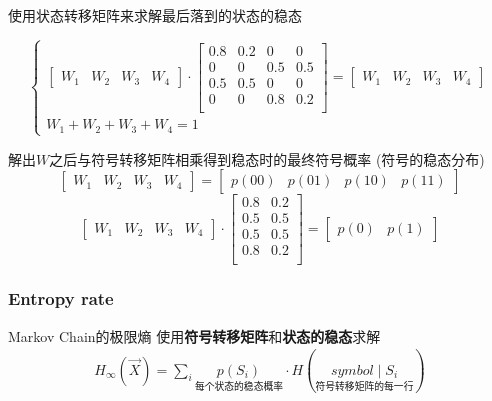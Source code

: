 \documentclass[a4paper]{report}
\begin{document}
使用状态转移矩阵来求解最后落到的状态的稳态

\[
  \begin{cases}
    \begin{bmatrix}
      W_1&W_2&W_3&W_4
    \end{bmatrix}
    \cdot 
      \begin{bmatrix}
   0.8 & 0.2&0&0  \\
  0&0& 0.5 & 0.5  \\
   0.5 & 0.5&0&0  \\
  0&0& 0.8 & 0.2  \\
  \end{bmatrix}
    =
        \begin{bmatrix}
      W_1&W_2&W_3&W_4
    \end{bmatrix}
    \\
    W_1+W_2+W_3+W_4=1
  \end{cases}
  \]

  解出$W$之后与符号转移矩阵相乘得到稳态时的最终符号概率 (符号的稳态分布)
  \[
        \begin{bmatrix}
      W_1&W_2&W_3&W_4
    \end{bmatrix}
    =
    \begin{bmatrix}
      p(00)&p(01)&p(10)&p(11)
    \end{bmatrix}
    \]
\[
    \begin{bmatrix}
      W_1&W_2&W_3&W_4
    \end{bmatrix}
    \cdot 
      \begin{bmatrix}
   0.8 & 0.2  \\
   0.5 & 0.5  \\
   0.5 & 0.5  \\
   0.8 & 0.2  \\
  \end{bmatrix}
    =
        \begin{bmatrix}
      p(0)&p(1)
    \end{bmatrix}
  \]



\subsubsection{Entropy rate}
Markov Chain的极限熵
使用\textbf{符号转移矩阵}和\textbf{状态的稳态}求解
\begin{align*}
  H_\infty (\vec{X})=\displaystyle\sum_{i}\underset{\text{每个状态的稳态概率}}{p(S_i)} \cdot H(\underset{\text{符号转移矩阵的每一行}}{symbol\mid S_i} )
\end{align*}
\end{document}

